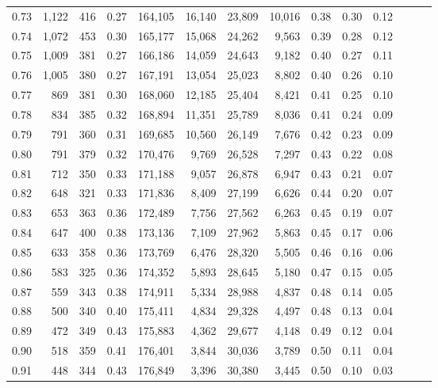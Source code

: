\begin{tabular}{rrrrrrrrrrrrrr}
0.73 &  1,122 &    416 &  0.27 &  164,105 &   16,140 &  23,809 &  10,016 &  0.38 &  0.30 &      0.12 \\
0.74 &  1,072 &    453 &  0.30 &  165,177 &   15,068 &  24,262 &   9,563 &  0.39 &  0.28 &      0.12 \\
0.75 &  1,009 &    381 &  0.27 &  166,186 &   14,059 &  24,643 &   9,182 &  0.40 &  0.27 &      0.11 \\
0.76 &  1,005 &    380 &  0.27 &  167,191 &   13,054 &  25,023 &   8,802 &  0.40 &  0.26 &      0.10 \\
0.77 &    869 &    381 &  0.30 &  168,060 &   12,185 &  25,404 &   8,421 &  0.41 &  0.25 &      0.10 \\
0.78 &    834 &    385 &  0.32 &  168,894 &   11,351 &  25,789 &   8,036 &  0.41 &  0.24 &      0.09 \\
0.79 &    791 &    360 &  0.31 &  169,685 &   10,560 &  26,149 &   7,676 &  0.42 &  0.23 &      0.09 \\
0.80 &    791 &    379 &  0.32 &  170,476 &    9,769 &  26,528 &   7,297 &  0.43 &  0.22 &      0.08 \\
0.81 &    712 &    350 &  0.33 &  171,188 &    9,057 &  26,878 &   6,947 &  0.43 &  0.21 &      0.07 \\
0.82 &    648 &    321 &  0.33 &  171,836 &    8,409 &  27,199 &   6,626 &  0.44 &  0.20 &      0.07 \\
0.83 &    653 &    363 &  0.36 &  172,489 &    7,756 &  27,562 &   6,263 &  0.45 &  0.19 &      0.07 \\
0.84 &    647 &    400 &  0.38 &  173,136 &    7,109 &  27,962 &   5,863 &  0.45 &  0.17 &      0.06 \\
0.85 &    633 &    358 &  0.36 &  173,769 &    6,476 &  28,320 &   5,505 &  0.46 &  0.16 &      0.06 \\
0.86 &    583 &    325 &  0.36 &  174,352 &    5,893 &  28,645 &   5,180 &  0.47 &  0.15 &      0.05 \\
0.87 &    559 &    343 &  0.38 &  174,911 &    5,334 &  28,988 &   4,837 &  0.48 &  0.14 &      0.05 \\
0.88 &    500 &    340 &  0.40 &  175,411 &    4,834 &  29,328 &   4,497 &  0.48 &  0.13 &      0.04 \\
0.89 &    472 &    349 &  0.43 &  175,883 &    4,362 &  29,677 &   4,148 &  0.49 &  0.12 &      0.04 \\
0.90 &    518 &    359 &  0.41 &  176,401 &    3,844 &  30,036 &   3,789 &  0.50 &  0.11 &      0.04 \\
0.91 &    448 &    344 &  0.43 &  176,849 &    3,396 &  30,380 &   3,445 &  0.50 &  0.10 &      0.03 \\

\end{tabular}
